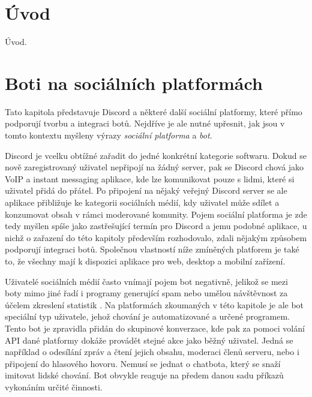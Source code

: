 \documentclass[FM]{tulthesis}
\begin{document}
	
	\chapter{Úvod}
	
	Úvod.
	
	\chapter{Boti na sociálních platformách}
	
	Tato kapitola představuje Discord a některé další sociální platformy, které přímo podporují tvorbu a integraci botů. Nejdříve je ale nutné upřesnit, jak jsou v tomto kontextu myšleny výrazy \textit{sociální platforma} a \textit{bot}.
	
	Discord je vcelku obtížné zařadit do jedné konkrétní kategorie softwaru. Dokud se nově zaregistrovaný uživatel nepřipojí na žádný server, pak se Discord chová jako VoIP a instant messaging aplikace, kde lze komunikovat pouze s lidmi, které si uživatel přidá do přátel. Po připojení na nějaký veřejný Discord server se ale aplikace přibližuje ke kategorii sociálních médií, kdy uživatel může sdílet a konzumovat obsah v rámci moderované komunity. Pojem sociální platforma je zde tedy myšlen spíše jako zastřešující termín pro Discord a jemu podobné aplikace, u nichž o zařazení do této kapitoly především rozhodovalo, zdali nějakým způsobem podporují integraci botů. Společnou vlastností níže zmíněných platforem je také to, že všechny mají k dispozici aplikace pro web, desktop a mobilní zařízení.
	
	Uživatelé sociálních médií často vnímají pojem bot negativně, jelikož se mezi boty mimo jiné řadí i programy generující spam nebo umělou návštěvnost za účelem zkreslení statistik \cite{lit_Discord}. Na platformách zkoumaných v této kapitole je ale bot speciální typ uživatele, jehož chování je automatizované a určené programem. Tento bot je zpravidla přidán do skupinové konverzace, kde pak za pomoci volání API dané platformy dokáže provádět stejné akce jako běžný uživatel. Jedná se například o odesílání zpráv a čtení jejich obsahu, moderaci členů serveru, nebo i připojení do hlasového hovoru. Nemusí se jednat o chatbota, který se snaží imitovat lidské chování. Bot obvykle reaguje na předem danou sadu příkazů vykonáním určité činnosti.
		
\end{document}
